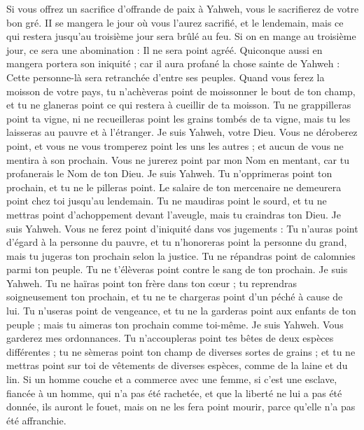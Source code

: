 \begin{multicols}{2}
Si vous offrez un sacrifice d'offrande de paix à Yahweh, vous le sacrifierez de votre bon gré.
II se mangera le jour où vous l'aurez sacrifié, et le lendemain, mais ce qui restera jusqu'au troisième jour sera brûlé au feu.
Si on en mange au troisième jour, ce sera une abomination : Il ne sera point agréé.
Quiconque aussi en mangera portera son iniquité ; car il aura profané la chose sainte de Yahweh : Cette personne-là sera retranchée d'entre ses peuples.
Quand vous ferez la moisson de votre pays, tu n'achèveras point de moissonner le bout de ton champ, et tu ne glaneras point ce qui restera à cueillir de ta moisson.
Tu ne grappilleras point ta vigne, ni ne recueilleras point les grains tombés de ta vigne, mais tu les laisseras au pauvre et à l'étranger. Je suis Yahweh, votre Dieu.
Vous ne déroberez point, et vous ne vous tromperez point les uns les autres ; et aucun de vous ne mentira à son prochain.
Vous ne jurerez point par mon Nom en mentant, car tu profanerais le Nom de ton Dieu. Je suis Yahweh.
Tu n'opprimeras point ton prochain, et tu ne le pilleras point. Le salaire de ton mercenaire ne demeurera point chez toi jusqu'au lendemain.
Tu ne maudiras point le sourd, et tu ne mettras point d'achoppement devant l'aveugle, mais tu craindras ton Dieu. Je suis Yahweh.
Vous ne ferez point d'iniquité dans vos jugements : Tu n'auras point d'égard à la personne du pauvre, et tu n'honoreras point la personne du grand, mais tu jugeras ton prochain selon la justice.
Tu ne répandras point de calomnies parmi ton peuple. Tu ne t'élèveras point contre le sang de ton prochain. Je suis Yahweh.
Tu ne haïras point ton frère dans ton cœur ; tu reprendras soigneusement ton prochain, et tu ne te chargeras point d'un péché à cause de lui.
Tu n'useras point de vengeance, et tu ne la garderas point aux enfants de ton peuple ; mais tu aimeras ton prochain comme toi-même. Je suis Yahweh.
Vous garderez mes ordonnances. Tu n'accoupleras point tes bêtes de deux espèces différentes ; tu ne sèmeras point ton champ de diverses sortes de grains ; et tu ne mettras point sur toi de vêtements de diverses espèces, comme de la laine et du lin.
Si un homme couche et a commerce avec une femme, si c'est une esclave, fiancée à un homme, qui n'a pas été rachetée, et que la liberté ne lui a pas été donnée, ils auront le fouet, mais on ne les fera point mourir, parce qu'elle n'a pas été affranchie.

\end{multicols}
